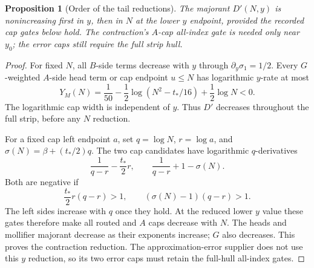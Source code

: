 \documentclass[11pt]{article}
\newtheorem{proposition}[theorem]{Proposition}
\theoremstyle{remark}
\newcommand{\tstar}{t_*}
\numberwithin{equation}{section}
\begin{document}
\begin{proposition}[Order of the tail reductions]\label{prop:tailorder}
The majorant $D'(N,y)$ is nonincreasing first in $y$, then in $N$ at the
lower $y$ endpoint, provided the recorded cap gates below hold.
The contraction's $A$-cap all-index gate is needed only near $y_0$;
the error caps still require the full strip hull.
\end{proposition}
\begin{proof}
For fixed $N$, all $B$-side terms decrease with $y$ through
$\partial_y\sigma_1=1/2$. Every $G$-weighted $A$-side head term or cap
endpoint $u\le N$ has logarithmic $y$-rate at most
\[
 Y_M(N)=\frac1{50}-\frac12\log(N^2-\tstar/16)+\frac12\log N<0.
\]
The logarithmic cap width is independent of $y$. Thus $D'$ decreases
throughout the full strip, before any $N$ reduction.

For a fixed cap left endpoint $a$, set $q=\log N$, $r=\log a$, and
$\sigma(N)=\beta+(\tstar/2)q$. The two cap candidates have logarithmic
$q$-derivatives
\[
 \frac1{q-r}-\frac{\tstar}{2}r,\qquad
 \frac1{q-r}+1-\sigma(N).
\]
Both are negative if
\begin{equation}\label{eq:Ngates}
 \frac{\tstar}{2}r(q-r)>1,\qquad
 (\sigma(N)-1)(q-r)>1.
\end{equation}
The left sides increase with $q$ once they hold. At the reduced lower
$y$ value these gates therefore make all routed and $A$ caps decrease
with $N$. The heads and mollifier majorant decrease as their exponents
increase; $G$ also decreases. This proves the contraction reduction.
The approximation-error supplier does not use this $y$ reduction, so
its two error caps must retain the full-hull all-index gates.
\end{proof}
\end{document}
